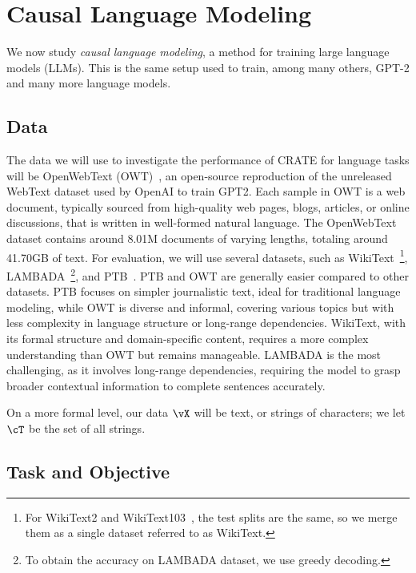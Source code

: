 \documentclass[\toplevelprefix/book-main.tex]{subfiles}
\begin{document}
\section{Causal Language Modeling}\label{sec:clm_text}

We now study \textit{causal language modeling}, a method for training large language models (LLMs). This is the same setup used to train, among many others, GPT-2 and many more language models. 

\subsection{Data} \label{sub:clm_text_data}

The data we will use to investigate the performance of CRATE for language tasks will be OpenWebText (OWT)~\cite{Gokaslan2019OpenWeb}, an open-source reproduction of the unreleased WebText dataset used by OpenAI to train GPT2. Each sample in OWT is a web document, typically sourced from high-quality web pages, blogs, articles, or online discussions, that is written in well-formed natural language. The OpenWebText dataset contains around 8.01M documents of varying lengths, totaling around 41.70GB of text. For evaluation, we will use several datasets, such as WikiText~\cite{merity2016pointer}\footnote{For WikiText2 and WikiText103~\cite{merity2016pointer}, the test splits are the same, so we merge them as a single dataset referred to as WikiText.}, LAMBADA~\cite{paperno2016lambadadatasetwordprediction}\footnote{To obtain the accuracy on LAMBADA dataset, we use greedy decoding.}, and PTB~\cite{marcus-etal-1993-building}. PTB and OWT are generally easier compared to other datasets. PTB focuses on simpler journalistic text, ideal for traditional language modeling, while OWT is diverse and informal, covering various topics but with less complexity in language structure or long-range dependencies. WikiText, with its formal structure and domain-specific content, requires a more complex understanding than OWT but remains manageable. LAMBADA is the most challenging, as it involves long-range dependencies, requiring the model to grasp broader contextual information to complete sentences accurately. 

On a more formal level, our data \(\vX\) will be text, or strings of characters; we let \(\cT\) be the set of all strings.

\subsection{Task and Objective} \label{sub:clm_text_objective}
\end{document}
